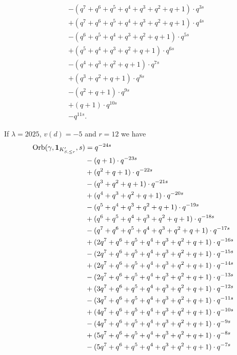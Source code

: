 \begin{example}
\begin{align*}
    &- (q^7+q^6+q^5+q^4+q^3+q^2+q+1) \cdot q^{3s} \\
    &+ (q^7+q^6+q^5+q^4+q^3+q^2+q+1) \cdot q^{4s} \\
    &- (q^6+q^5+q^4+q^3+q^2+q+1) \cdot q^{5s} \\
    &+ (q^5+q^4+q^3+q^2+q+1) \cdot q^{6s} \\
    &- (q^4+q^3+q^2+q+1) \cdot q^{7s} \\
    &+ (q^3+q^2+q+1) \cdot q^{8s} \\
    &- (q^2+q+1) \cdot q^{9s} \\
    &+ (q+1) \cdot q^{10s} \\
    &- q^{11s}.
  \end{align*}
\end{example}
\begin{example}
  If $\lambda = 2025$, $v(d) = -5$ and $r = 12$ we have
  \begin{align*}
    \Orb(\gamma, \mathbf{1}_{K'_{S, \le r}}, s)
    &= q^{-24s} \\
    &- (q+1) \cdot q^{-23s} \\
    &+ (q^2+q+1) \cdot q^{-22s} \\
    &- (q^3+q^2+q+1) \cdot q^{-21s} \\
    &+ (q^4+q^3+q^2+q+1) \cdot q^{-20s} \\
    &- (q^5+q^4+q^3+q^2+q+1) \cdot q^{-19s} \\
    &+ (q^6+q^5+q^4+q^3+q^2+q+1) \cdot q^{-18s} \\
    &- (q^7+q^6+q^5+q^4+q^3+q^2+q+1) \cdot q^{-17s} \\
    &+ (2q^7+q^6+q^5+q^4+q^3+q^2+q+1) \cdot q^{-16s} \\
    &- (2q^7+q^6+q^5+q^4+q^3+q^2+q+1) \cdot q^{-15s} \\
    &+ (2q^7+q^6+q^5+q^4+q^3+q^2+q+1) \cdot q^{-14s} \\
    &- (2q^7+q^6+q^5+q^4+q^3+q^2+q+1) \cdot q^{-13s} \\
    &+ (3q^7+q^6+q^5+q^4+q^3+q^2+q+1) \cdot q^{-12s} \\
    &- (3q^7+q^6+q^5+q^4+q^3+q^2+q+1) \cdot q^{-11s} \\
    &+ (4q^7+q^6+q^5+q^4+q^3+q^2+q+1) \cdot q^{-10s} \\
    &- (4q^7+q^6+q^5+q^4+q^3+q^2+q+1) \cdot q^{-9s} \\
    &+ (5q^7+q^6+q^5+q^4+q^3+q^2+q+1) \cdot q^{-8s} \\
    &- (5q^7+q^6+q^5+q^4+q^3+q^2+q+1) \cdot q^{-7s} \\

\end{align*}
\end{example}
